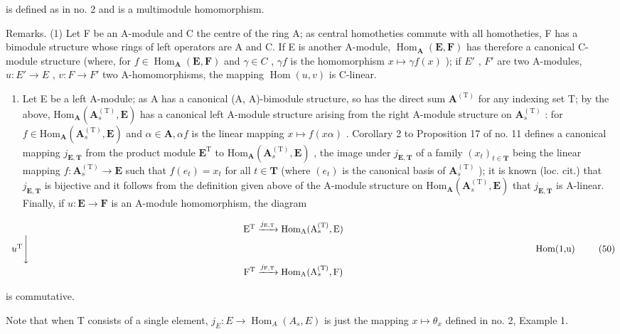 is defined as in no. 2 and is a multimodule homomorphism.

Remarks. (1) Let F be an A-module and C the centre of the ring A; as central homotheties commute with all homotheties, F has a bimodule structure whose rings of left operators are A and C. If E is another A-module, \(\operatorname{Hom}_{\mathbf{A}}(\mathbf{E}, \mathbf{F})\) has therefore a canonical C-module structure (where, for \(f \in \operatorname{Hom}_{\mathbf{A}}(\mathbf{E}, \mathbf{F})\) and \(\gamma \in C\) , \(\gamma f\) is the homomorphism \(x \mapsto \gamma f(x)\) ); if \(E'\) , \(F'\) are two A-modules, \(u: E' \to E\) , \(v: F \to F'\) two A-homomorphisms, the mapping \(\operatorname{Hom}(u, v)\) is C-linear.

\begin{enumerate}
\def\labelenumi{(\arabic{enumi})}
\setcounter{enumi}{1}
\tightlist
\item
  Let E be a left A-module; as A has a canonical (A, A)-bimodule structure, so has the direct sum \(\mathbf{A}^{(\mathrm{T})}\) for any indexing set T; by the above, \(\mathrm{Hom}_{\mathbf{A}}(\mathbf{A}_{s}^{\mathrm{(T)}},\mathbf{E})\) has a canonical left A-module structure arising from the right A-module structure on \(\mathbf{A}_{s}^{\mathrm{(T)}}\) : for \(f\in\mathrm{Hom}_{\mathbf{A}}(\mathbf{A}_{s}^{\mathrm{(T)}},\mathbf{E})\) and \(\alpha\in\mathbf{A},\alpha f\) is the linear mapping \(x\mapsto f(x\alpha)\) . Corollary 2 to Proposition 17 of no. 11 defines a canonical mapping \(j_{\mathbf{E},\mathbf{T}}\) from the product module \(\mathbf{E}^{\mathrm{T}}\) to \(\mathrm{Hom}_{\mathbf{A}}(\mathbf{A}_{s}^{\mathrm{(T)}},\mathbf{E})\) , the image under \(j_{\mathbf{E},\mathbf{T}}\) of a family \((x_{t})_{t\in\mathbf{T}}\) being the linear mapping \(f:\mathbf{A}_{s}^{\mathrm{(T)}}\to\mathbf{E}\) such that \(f(e_{t})=x_{t}\) for all \(t\in\mathbf{T}\) (where \((e_{t})\) is the canonical basis of \(\mathbf{A}_{s}^{\mathrm{(T)}}\) ); it is known (loc. cit.) that \(j_{\mathbf{E},\mathbf{T}}\) is bijective and it follows from the definition given above of the A-module structure on \(\mathrm{Hom}_{\mathbf{A}}(\mathbf{A}_{s}^{\mathrm{(T)}},\mathbf{E})\) that \(j_{\mathbf{E},\mathbf{T}}\) is A-linear. Finally, if \(u:\mathbf{E}\to\mathbf{F}\) is an A-module homomorphism, the diagram
\end{enumerate}

\[
\begin{array}{c} \mathrm {E^ {T}} \xrightarrow {j _ {\mathrm{E,T}}} \operatorname{Hom} _ {\mathrm{A}} (\mathrm{A} _ {s} ^ {(\mathrm{T})}, \mathrm{E}) \\ u ^ {\mathrm{T}} \Biggl \downarrow \qquad \qquad \qquad \qquad \qquad \qquad \qquad \qquad \qquad \qquad \qquad \qquad \qquad \qquad \qquad \qquad \qquad \qquad \qquad \qquad \qquad \qquad \qquad \qquad \qquad \qquad \qquad \text {Hom(1,u)} \\ \mathrm {F^ {T}} \xrightarrow {j _ {\mathrm{F,T}}} \operatorname{Hom} _ {\mathrm{A}} (\mathrm{A} _ {s} ^ {(\mathrm{T})}, \mathrm{F}) \end{array}\tag{50}
\]

is commutative.

Note that when T consists of a single element, \(j_{E}:E \to \operatorname{Hom}_{A}(A_{s}, E)\) is just the mapping \(x \mapsto \theta_{x}\) defined in no. 2, Example 1.

